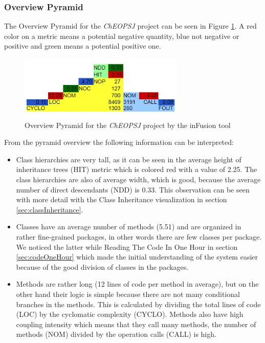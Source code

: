 \documentclass[a4paper]{article}
\begin{document}
\subsubsection{Overview Pyramid}
The Overview Pyramid for the \emph{ChEOPSJ} project can be seen in Figure \ref{fig:pyramid}.
A red color on a metric means a potential negative quantity, blue not negative or positive and green means a potential positive one.

\begin{figure}[h]
\centering
\includegraphics[width=0.7\textwidth]{Images/overviewPyramid}
\caption{Overview Pyramid for the \emph{ChEOPSJ} project by the inFusion tool}
\label{fig:pyramid}
\end{figure}

From the pyramid overview the following information can be interpreted:
\begin{itemize}
\item Class hierarchies are very tall, as it can be seen in the average height of inheritance trees (HIT) metric which is colored red with a value of 2.25. The class hierarchies are also of average width, which is good, because the average number of direct descendants (NDD) is 0.33. This observation can be seen with more detail with the Class Inheritance visualization in section \ref{sec:classInheritance}.

\item Classes have an average number of methods (5.51) and are organized in rather fine-grained packages, in other words there are few classes per package. We noticed the latter while Reading The Code In One Hour in section \ref{sec:codeOneHour} which made the initial understanding of the system easier because of the good division of classes in the packages.

\item Methods are rather long (12 lines of code per method in average), but on the other hand their logic is simple because there are not many conditional branches in the methods. This is calculated by dividing the total lines of code (LOC) by the cyclomatic complexity (CYCLO). Methods also have high coupling intensity which means that they call many methods, the number of methods (NOM) divided by the operation calls (CALL) is high.
\end{itemize}
\end{document}
